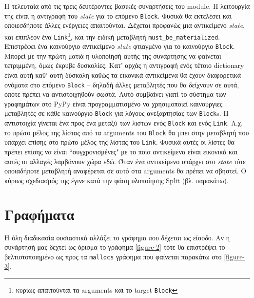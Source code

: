 Η τελευταία από τις τρεις δευτέροντες βασικές συναρτήσεις του module. Η
λειτουργία της είναι η αντιγραφή του \textit{state} για το επόμενο
\texttt{Block}. Φυσικά θα εκτελέσει και οποιεσδήποτε άλλες ενέργειες
απαιτούνται. Δέχεται προφανώς μια αντικείμενο \textit{state}, και επιπλέον ένα
\texttt{Link}\footnote{κυρίως απαιτούνται τα arguments και το target
\texttt{Block}}, και την ειδική μεταβλητή \texttt{must\_be\_materialized}.
Επιστρέφει ένα καινούργιο αντικείμενο \textit{state} φτιαγμένο για το καινούργιο
\texttt{Block}. Μπορεί με την πρώτη ματιά η υλοποίησή αυτής της συνάρτησης να
φαίνεται τετριμμένη, όμως έκρυβε δυσκολίες. Κατ' αρχάς η αντιγραφή ενός τέτοιο
dictionary είναι αυτή καθ' αυτή δύσκολη καθώς τα εικονικά αντικείμενα θα έχουν
διαφορετικά ονόματα στο επόμενο \texttt{Block} – δηλαδή άλλες μεταβλητές που θα
δείχνουν σε αυτά, οπότε πρέπει να αντιστοιχηθούν σωστά. Αυτό συμβαίνει γιατί το
σύστημα των γραφημάτων στο PyPy είναι προγραμματισμένο να χρησιμοποιεί
καινούργιες μεταβλητές σε κάθε καινούργιο \texttt{Block} για λόγους ανεξαρτησίας
των \texttt{Block}s. Η αντιστοιχία γίνεται ένα προς ένα μεταξύ των λιστών ενός
\texttt{Block} και ενός \texttt{Link}. Λ.χ. το πρώτο μέλος της λίστας από τα
arguments του \texttt{Block} θα μπει στην μεταβλητή που υπάρχει επίσης στο πρώτο
μέλος της λίστας του \texttt{Link}. Φυσικά αυτές οι λίστες θα πρέπει επίσης να
είναι ``συγχρονισμένες" με το ποια αντικείμενα είναι εικονικά και αυτές οι
αλλαγές λαμβάνουν χώρα εδώ. Όταν ένα αντικείμενο υπάρχει στο \textit{state} τότε
οποιαδήποτε μεταβλητή αναφέρεται σε αυτό στα arguments θα πρέπει να σβηστεί. Ο
κύριως σχεδιασμός της έγινε κατά την φάση υλοποίησης Split (βλ. παρακάτω).


\section{Γραφήματα}

Η όλη διαδικασία ουσιαστικά αλλάζει το γράφημα που δέχεται ως είσοδο. Αν η
συνάρτησή μας δεχτεί ως όρισμα το γράφημα \ref{figure-2} τότε θα επιστρέψει το
βελτιστοποιημένο ως προς τα \texttt{mallocs} γράφημα που φαίνεται παρακάτω στο
\ref{figure-3}.


